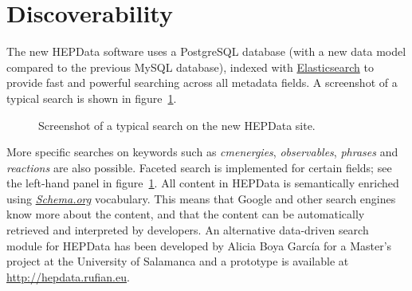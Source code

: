 \documentclass[a4paper]{jpconf}
\begin{document}
\section{Discoverability}

The new HEPData software uses a PostgreSQL database (with a new data model compared to the previous MySQL database), indexed with \href{https://www.elastic.co}{Elasticsearch} to provide fast and powerful searching across all metadata fields.  A screenshot of a typical search is shown in figure~\ref{fig:search}.
%
\begin{figure}
  \begin{center}
  \end{center}
  \caption{\label{fig:search}Screenshot of a typical search on the new HEPData site.}
\end{figure}
%
More specific searches on keywords such as \emph{cmenergies}, \emph{observables}, \emph{phrases} and \emph{reactions} are also possible.  Faceted search is implemented for certain fields; see the left-hand panel in figure~\ref{fig:search}.  All content in HEPData is semantically enriched using \href{https://schema.org/}{\emph{Schema.org}} vocabulary.  This means that Google and other search engines know more about the content, and that the content can be automatically retrieved and interpreted by developers.  An alternative data-driven search module for HEPData has been developed by Alicia Boya Garc\'{i}a for a Master's project at the University of Salamanca and a prototype is available at \url{http://hepdata.rufian.eu}.
\end{document}
